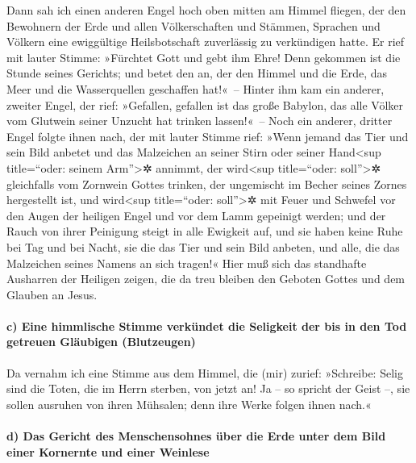  Dann sah ich einen anderen Engel hoch oben mitten am
Himmel fliegen, der den Bewohnern der Erde und allen Völkerschaften und
Stämmen, Sprachen und Völkern eine ewiggültige Heilsbotschaft
zuverlässig zu verkündigen hatte.  Er rief mit lauter
Stimme: »Fürchtet Gott und gebt ihm Ehre! Denn gekommen ist die Stunde
seines Gerichts; und betet den an, der den Himmel und die Erde, das Meer
und die Wasserquellen geschaffen hat!«~--  Hinter ihm kam
ein anderer, zweiter Engel, der rief: »Gefallen, gefallen ist das große
Babylon, das alle Völker vom Glutwein seiner Unzucht hat trinken
lassen!«~--  Noch ein anderer, dritter Engel folgte ihnen
nach, der mit lauter Stimme rief: »Wenn jemand das Tier und sein Bild
anbetet und das Malzeichen an seiner Stirn oder seiner Hand\textless sup
title=``oder: seinem Arm''\textgreater✲ annimmt,  der
wird\textless sup title=``oder: soll''\textgreater✲ gleichfalls vom
Zornwein Gottes trinken, der ungemischt im Becher seines Zornes
hergestellt ist, und wird\textless sup title=``oder: soll''\textgreater✲
mit Feuer und Schwefel vor den Augen der heiligen Engel und vor dem Lamm
gepeinigt werden;  und der Rauch von ihrer Peinigung
steigt in alle Ewigkeit auf, und sie haben keine Ruhe bei Tag und bei
Nacht, sie die das Tier und sein Bild anbeten, und alle, die das
Malzeichen seines Namens an sich tragen!«  Hier muß sich
das standhafte Ausharren der Heiligen zeigen, die da treu bleiben den
Geboten Gottes und dem Glauben an Jesus.

\hypertarget{c-eine-himmlische-stimme-verkuxfcndet-die-seligkeit-der-bis-in-den-tod-getreuen-gluxe4ubigen-blutzeugen}{%
\paragraph{c) Eine himmlische Stimme verkündet die Seligkeit der bis in
den Tod getreuen Gläubigen
(Blutzeugen)}\label{c-eine-himmlische-stimme-verkuxfcndet-die-seligkeit-der-bis-in-den-tod-getreuen-gluxe4ubigen-blutzeugen}}

 Da vernahm ich eine Stimme aus dem Himmel, die (mir)
zurief: »Schreibe: Selig sind die Toten, die im Herrn sterben, von jetzt
an! Ja -- so spricht der Geist --, sie sollen ausruhen von ihren
Mühsalen; denn ihre Werke folgen ihnen nach.«

\hypertarget{d-das-gericht-des-menschensohnes-uxfcber-die-erde-unter-dem-bild-einer-kornernte-und-einer-weinlese}{%
\paragraph{d) Das Gericht des Menschensohnes über die Erde unter dem
Bild einer Kornernte und einer
Weinlese}\label{d-das-gericht-des-menschensohnes-uxfcber-die-erde-unter-dem-bild-einer-kornernte-und-einer-weinlese}}

